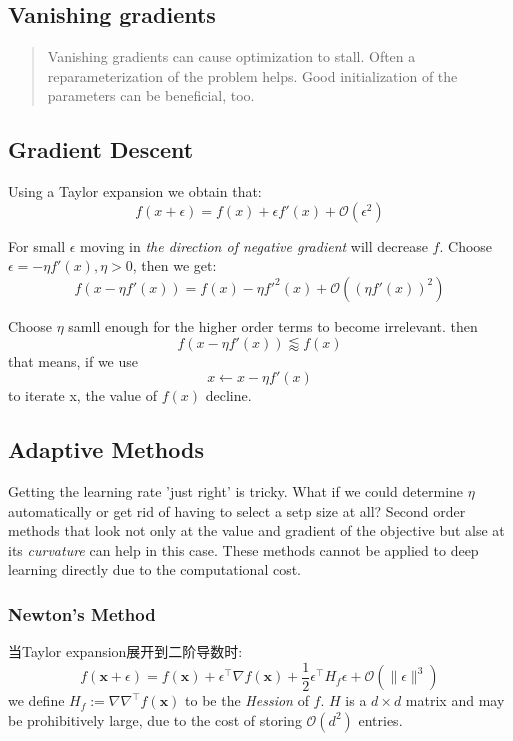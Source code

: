 \subsection{Vanishing gradients}
\begin{quotation}
    Vanishing gradients can cause optimization to stall. Often a reparameterization of the problem
     helps. Good initialization of the parameters can be beneficial, too.\cite{zhang2020dive}
\end{quotation}

\subsection{Gradient Descent}
Using a Taylor expansion we obtain that:
\begin{equation}
    f(x + \epsilon) = f(x) + \epsilon f'(x) + \mathcal{O} (\epsilon^2)
\end{equation}
\par
For small $\epsilon$ moving in \textit{the direction of negative gradient} will decrease $f$. Choose $\epsilon = 
-\eta f'(x), \eta > 0$, then we get:
\begin{equation}
    f(x - \eta f'(x)) = f(x) - \eta f'^2(x) + \mathcal{O} ((\eta f'(x))^2)
\end{equation}
\par Choose $\eta$ samll enough for the higher order terms to become irrelevant. then
\begin{equation}
    f(x - \eta f'(x)) \lessapprox f(x)
\end{equation}
that means, if we use 
\begin{equation}
    x \leftarrow x - \eta f'(x)
\end{equation}
to iterate x, the value of $f(x)$ decline.

\subsection{Adaptive Methods}
Getting the learning rate 'just right' is tricky. What if we could determine $\eta$ automatically or get rid of having to select
a setp size at all? Second order methods that look not only at the value and gradient of the objective but alse at its \textit{curvature}
can help in this case. These methods cannot be applied to deep learning directly due to the computational cost.

\subsubsection{Newton's Method}
当Taylor expansion展开到二阶导数时:
\begin{equation}
    f(\mathbf{x} + \epsilon) = f(\mathbf{x}) + \epsilon^\top \nabla f(\mathbf{x}) + \frac{1}{2} \epsilon^\top H_f \epsilon 
    + \mathcal{O}(\|\epsilon\|^3)
\end{equation}
we define $H_f := \nabla \nabla ^\top f(\mathbf{x})$ to be the \textit{Hession} of $f$. $H$ is a $d \times  d$ matrix and may be
prohibitively large, due to the cost of storing $\mathcal{O}(d^2)$ entries.

